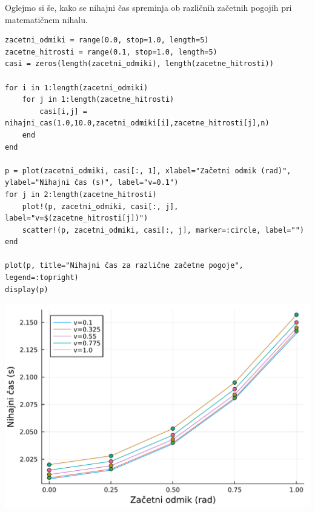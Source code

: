\documentclass[12pt,a4paper]{article}
\begin{document}
Oglejmo si še, kako se nihajni čas spreminja ob različnih začetnih pogojih pri matematičnem nihalu.


\begin{verbatim}
zacetni_odmiki = range(0.0, stop=1.0, length=5)
zacetne_hitrosti = range(0.1, stop=1.0, length=5)
casi = zeros(length(zacetni_odmiki), length(zacetne_hitrosti))

for i in 1:length(zacetni_odmiki)
    for j in 1:length(zacetne_hitrosti)
        casi[i,j] = nihajni_cas(1.0,10.0,zacetni_odmiki[i],zacetne_hitrosti[j],n)
    end
end

p = plot(zacetni_odmiki, casi[:, 1], xlabel="Začetni odmik (rad)", ylabel="Nihajni čas (s)", label="v=0.1")
for j in 2:length(zacetne_hitrosti)
    plot!(p, zacetni_odmiki, casi[:, j], label="v=$(zacetne_hitrosti[j])")
    scatter!(p, zacetni_odmiki, casi[:, j], marker=:circle, label="")
end

plot(p, title="Nihajni čas za različne začetne pogoje", legend=:topright)
display(p)
\end{verbatim}
\includegraphics[width=\linewidth]{jl_xzhxDb/demo_5_1.pdf}
\end{document}
